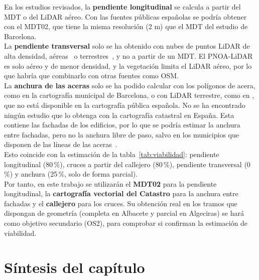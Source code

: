 En los estudios revisados, la \textbf{pendiente longitudinal} se calcula a partir del \gls{MDT} o del \gls{LiDAR} aéreo. Con las fuentes públicas españolas se podría obtener con el MDT02, que tiene la misma resolución (2 m) que el \gls{MDT} del estudio de Barcelona.
\\

La \textbf{pendiente transversal} solo se ha obtenido con nubes de puntos \gls{LiDAR} de alta densidad, aéreas~\parencite{hossain2026} o terrestres~\parencite{ahmadi2026}, y no a partir de un \gls{MDT}. El \gls{PNOA}-\gls{LiDAR}~\parencite{pnoa_lidar,pnoa_lidar_descargas} es solo aéreo y de menor densidad, y la vegetación limita el LiDAR aéreo, por lo que habría que combinarlo con otras fuentes como \gls{OSM}.
\\

La \textbf{anchura de las aceras} solo se ha podido calcular con los polígonos de acera, como en la cartografía municipal de Barcelona, o con \gls{LiDAR} terrestre, como en \textcite{ahmadi2026}, que no está disponible en la cartografía pública española. No se ha encontrado ningún estudio que lo obtenga con la cartografía catastral en España. Esta contiene las fachadas de los edificios, por lo que se podría estimar la anchura entre fachadas, pero no la anchura libre de paso, salvo en los municipios que disponen de las líneas de las aceras~\parencite{catastro_descarga_datos}.
\\

Esto coincide con la estimación de la tabla~\ref{tab:viabilidad}: pendiente longitudinal (80\,\%), cruces a partir del callejero (80\,\%), pendiente transversal (0\,\%) y anchura (25\,\%, solo de forma parcial).
\\

Por tanto, en este trabajo se utilizarán el \textbf{MDT02} para la pendiente longitudinal, la \textbf{cartografía vectorial del Catastro} para la anchura entre fachadas y el \textbf{callejero} para los cruces. Su obtención real en los tramos que dispongan de geometría (completa en Albacete y parcial en Algeciras) se hará como objetivo secundario (OS2), para comprobar si confirman la estimación de viabilidad.
\\

\section{Síntesis del capítulo}
\label{sec:sintesis-arte}

